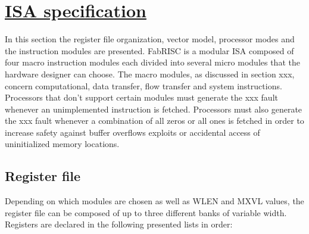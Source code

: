 \section[ISA specification]{\LARGE\underline{ISA specification}}

    \vspace{10pt}

    In this section the register file organization, vector model, processor modes and the instruction modules are presented. FabRISC is a modular ISA composed of four macro instruction modules each divided into several micro modules that the hardware designer can choose. The macro modules, as discussed in section xxx, concern computational, data transfer, flow transfer and system instructions. Processors that don't support certain modules must generate the xxx fault whenever an unimplemented instruction is fetched. Processors must also generate the xxx fault whenever a combination of all zeros or all ones is fetched in order to increase safety against buffer overflows exploits or accidental access of uninitialized memory locations.

    \subsection{Register file}

        \vspace{10pt}

        Depending on which modules are chosen as well as WLEN and MXVL values, the register file can be composed of up to three different banks of variable width. Registers are declared in the following presented lists in order:

